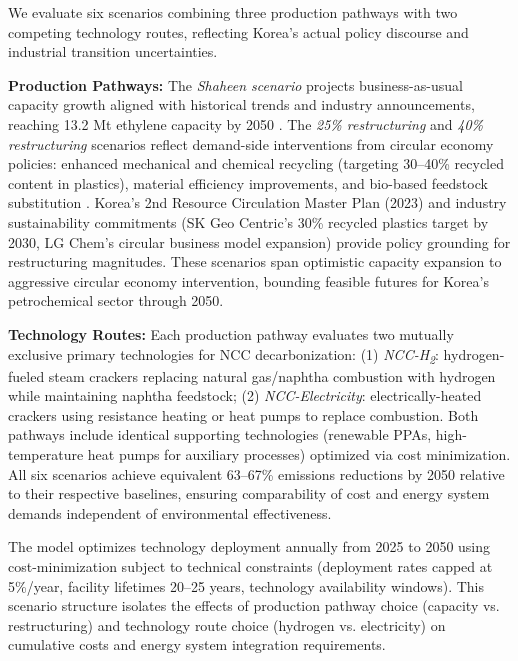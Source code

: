 \documentclass[11pt,a4paper]{article}
\begin{document}
We evaluate six scenarios combining three production pathways with two competing technology routes, reflecting Korea's actual policy discourse and industrial transition uncertainties.

\textbf{Production Pathways:} The \textit{Shaheen scenario} projects business-as-usual capacity growth aligned with historical trends and industry announcements, reaching 13.2 Mt ethylene capacity by 2050 \citep{KPIA2023,InvestKorea2023}. The \textit{25\% restructuring} and \textit{40\% restructuring} scenarios reflect demand-side interventions from circular economy policies: enhanced mechanical and chemical recycling (targeting 30--40\% recycled content in plastics), material efficiency improvements, and bio-based feedstock substitution \citep{EllenMacArthur2019,MaterialEconomics2019}. Korea's 2nd Resource Circulation Master Plan (2023) and industry sustainability commitments (SK Geo Centric's 30\% recycled plastics target by 2030, LG Chem's circular business model expansion) provide policy grounding for restructuring magnitudes. These scenarios span optimistic capacity expansion to aggressive circular economy intervention, bounding feasible futures for Korea's petrochemical sector through 2050.

\textbf{Technology Routes:} Each production pathway evaluates two mutually exclusive primary technologies for NCC decarbonization: (1) \textit{NCC-H\textsubscript{2}}: hydrogen-fueled steam crackers replacing natural gas/naphtha combustion with hydrogen while maintaining naphtha feedstock; (2) \textit{NCC-Electricity}: electrically-heated crackers using resistance heating or heat pumps to replace combustion. Both pathways include identical supporting technologies (renewable PPAs, high-temperature heat pumps for auxiliary processes) optimized via cost minimization. All six scenarios achieve equivalent 63--67\% emissions reductions by 2050 relative to their respective baselines, ensuring comparability of cost and energy system demands independent of environmental effectiveness.

The model optimizes technology deployment annually from 2025 to 2050 using cost-minimization subject to technical constraints (deployment rates capped at 5\%/year, facility lifetimes 20--25 years, technology availability windows). This scenario structure isolates the effects of production pathway choice (capacity vs. restructuring) and technology route choice (hydrogen vs. electricity) on cumulative costs and energy system integration requirements.
\end{document}
